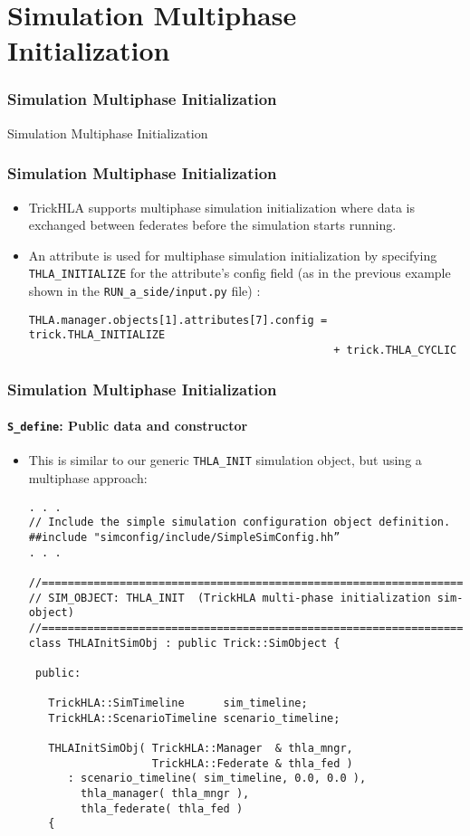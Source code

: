 
   \section{Simulation Multiphase Initialization}

   \begin{frame}
      \frametitle{Simulation Multiphase Initialization}
      \begin{center}
      \Huge{Simulation Multiphase Initialization}
      \end{center}
   \end{frame}
   
   \begin{frame}[fragile]
      \frametitle{Simulation Multiphase Initialization}
      \begin{itemize}
         \item TrickHLA supports multiphase simulation initialization where data
         is exchanged between federates before the simulation starts running.
         \item An attribute is used for multiphase simulation initialization by
         specifying \texttt{THLA\_INITIALIZE} for the attribute’s config field
         (as in the previous example shown in the \texttt{RUN\_a\_side/input.py}
         file) :
\begin{Verbatim}[frame=single, fontsize=\scriptsize]
THLA.manager.objects[1].attributes[7].config = trick.THLA_INITIALIZE
                                               + trick.THLA_CYCLIC
\end{Verbatim}
      \end{itemize}
   \end{frame}
   
   \begin{frame}[fragile]
      \frametitle{Simulation Multiphase Initialization}
      \framesubtitle{\texttt{S\_define}: Public data and constructor}
      \begin{itemize}
         \item This is similar to our generic \texttt{THLA\_INIT} simulation object, but
         using a multiphase approach:
\begin{Verbatim}[frame=single, fontsize=\tiny]
. . .
// Include the simple simulation configuration object definition.
##include "simconfig/include/SimpleSimConfig.hh”
. . .

//=============================================================================
// SIM_OBJECT: THLA_INIT  (TrickHLA multi-phase initialization sim-object)
//=============================================================================
class THLAInitSimObj : public Trick::SimObject {

 public:

   TrickHLA::SimTimeline      sim_timeline;
   TrickHLA::ScenarioTimeline scenario_timeline;

   THLAInitSimObj( TrickHLA::Manager  & thla_mngr,
                   TrickHLA::Federate & thla_fed ) 
      : scenario_timeline( sim_timeline, 0.0, 0.0 ),
        thla_manager( thla_mngr ),
        thla_federate( thla_fed )
   {
\end{Verbatim}
      \end{itemize}
   \end{frame}
   
